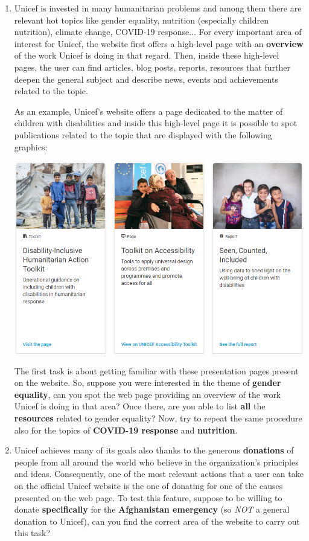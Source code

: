 \documentclass[11pt]{article}
\begin{document}
\begin{Form}
\begin{enumerate}
		\item Unicef is invested in many humanitarian problems and among them there are relevant hot topics like gender equality, nutrition (especially children nutrition), climate change, COVID-19 response... For every important area of interest for Unicef, the website first offers a high-level page with an \textbf{overview} of the work Unicef is doing in that regard. Then, inside these high-level pages, the user can find articles, blog posts, reports, resources that further deepen the general subject and describe news, events and achievements related to the topic.\clearpage
	
		As an example, Unicef's website offers a page dedicated to the matter of children with disabilities and inside this high-level page it is possible to spot publications related to the topic that are displayed with the following graphics:
		\begin{center}
			\includegraphics[width=0.6\linewidth]{res/Resources}
		\end{center}
		
		The first task is about getting familiar with these presentation pages present on the website. So, suppose you were interested in the theme of \textbf{gender equality}, can you spot the web page providing an overview of the work Unicef is doing in that area? Once there, are you able to list \textbf{all} the \textbf{resources} related to gender equality?
		Now, try to repeat the same procedure also for the topics of \textbf{COVID-19 response} and \textbf{nutrition}.
		
		\item Unicef achieves many of its goals also thanks to the generous \textbf{donations} of people from all around the world who believe in the organization's principles and ideas. Consequently, one of the most relevant actions that a user can take on the official Unicef website is the one of donating for one of the causes presented on the web page. To test this feature, suppose to be willing to donate \textbf{specifically} for the \textbf{Afghanistan emergency} (so \textit{NOT} a general donation to Unicef), can you find the correct area of the website to carry out this task?
		

\end{enumerate}
\end{Form}
\end{document}

